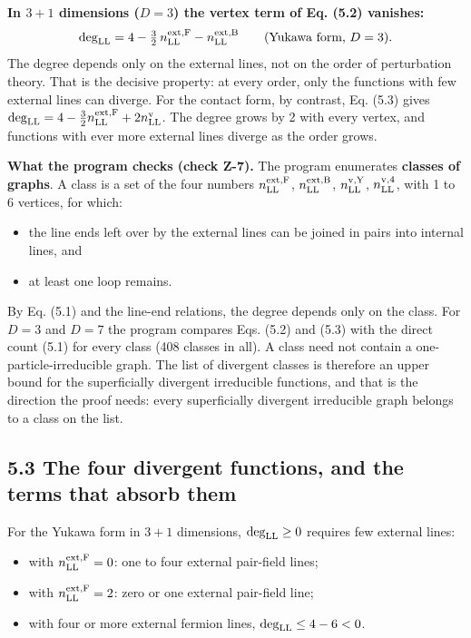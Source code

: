 \documentclass[
  10pt,
]{article}
\providecommand{\tightlist}{%
  \setlength{\itemsep}{0pt}\setlength{\parskip}{0pt}}
\begin{document}
\textbf{In \(3+1\) dimensions (\(D=3\)) the vertex term of Eq. (5.2)
vanishes:}
\[\deg_{\rm LL}=4-\tfrac32\,n^{\rm ext,F}_{\rm LL}-n^{\rm ext,B}_{\rm LL}\qquad\text{(Yukawa form, }D=3\text{)}.\]
The degree depends only on the external lines, not on the order of
perturbation theory. That is the decisive property: at every order, only
the functions with few external lines can diverge. For the contact form,
by contrast, Eq. (5.3) gives
\(\deg_{\rm LL}=4-\tfrac32n^{\rm ext,F}_{\rm LL}+2n^{\rm v}_{\rm LL}\).
The degree grows by 2 with every vertex, and functions with ever more
external lines diverge as the order grows.

\textbf{What the program checks (check Z-7).} The program enumerates
\textbf{classes of graphs}. A class is a set of the four numbers
\(n^{\rm ext,F}_{\rm LL}\), \(n^{\rm ext,B}_{\rm LL}\),
\(n^{\rm v,Y}_{\rm LL}\), \(n^{\rm v,4}_{\rm LL}\), with 1 to 6
vertices, for which:

\begin{itemize}
\tightlist
\item
  the line ends left over by the external lines can be joined in pairs
  into internal lines, and
\item
  at least one loop remains.
\end{itemize}

By Eq. (5.1) and the line-end relations, the degree depends only on the
class. For \(D=3\) and \(D=7\) the program compares Eqs. (5.2) and (5.3)
with the direct count (5.1) for every class (408 classes in all). A
class need not contain a one-particle-irreducible graph. The list of
divergent classes is therefore an upper bound for the superficially
divergent irreducible functions, and that is the direction the proof
needs: every superficially divergent irreducible graph belongs to a
class on the list.

\hypertarget{the-four-divergent-functions-and-the-terms-that-absorb-them}{%
\subsection{5.3 The four divergent functions, and the terms that absorb
them}\label{the-four-divergent-functions-and-the-terms-that-absorb-them}}

For the Yukawa form in \(3+1\) dimensions, \(\deg_{\rm LL}\ge0\)
requires few external lines:

\begin{itemize}
\tightlist
\item
  with \(n^{\rm ext,F}_{\rm LL}=0\): one to four external pair-field
  lines;
\item
  with \(n^{\rm ext,F}_{\rm LL}=2\): zero or one external pair-field
  line;
\item
  with four or more external fermion lines, \(\deg_{\rm LL}\le4-6<0\).
\end{itemize}
\end{document}
